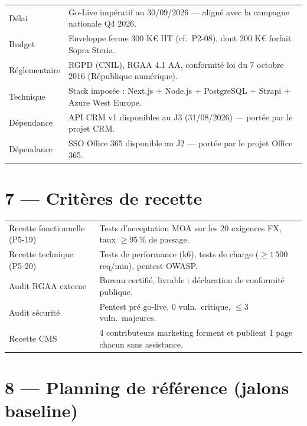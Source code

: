 \documentclass[11pt,a4paper,oneside]{report}
\begin{document}
\renewcommand{\arraystretch}{1.3}
\begin{tabularx}{\textwidth}{L{3cm} Y}
\toprule
{} &  \\
\midrule
Délai          & Go-Live impératif au 30/09/2026 --- aligné avec la campagne nationale Q4 2026. \\
Budget         & Enveloppe ferme 300 K€ HT (cf.\ P2-08), dont 200 K€ forfait Sopra Steria. \\
Réglementaire  & RGPD (CNIL), RGAA 4.1 AA, conformité loi du 7 octobre 2016 (République numérique). \\
Technique      & Stack imposée : Next.js + Node.js + PostgreSQL + Strapi + Azure West Europe. \\
Dépendance     & API CRM v1 disponibles au J3 (31/08/2026) --- portée par le projet CRM. \\
Dépendance     & SSO Office 365 disponible au J2 --- portée par le projet Office 365. \\
\bottomrule
\end{tabularx}

\section*{7 --- Critères de recette}

\renewcommand{\arraystretch}{1.3}
\begin{tabularx}{\textwidth}{L{4cm} Y}
\toprule
{} &  \\
\midrule
Recette fonctionnelle (P5-19) & Tests d'acceptation MOA sur les 20 exigences FX, taux $\geq 95\,\%$ de passage. \\
Recette technique (P5-20)     & Tests de performance (k6), tests de charge ($\geq 1\,500$ req/min), pentest OWASP. \\
Audit RGAA externe            & Bureau certifié, livrable : déclaration de conformité publique. \\
Audit sécurité                & Pentest pré go-live, 0 vuln.\ critique, $\leq 3$ vuln.\ majeures. \\
Recette CMS                   & 4 contributeurs marketing forment et publient 1 page chacun sans assistance. \\
\bottomrule
\end{tabularx}

\section*{8 --- Planning de référence (jalons baseline)}
\end{document}
